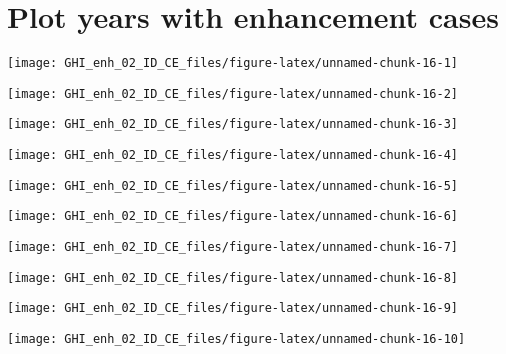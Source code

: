 \documentclass[
  10pt,
  a4paper,oneside]{article}
\begin{document}
\hypertarget{plot-years-with-enhancement-cases}{%
\section{Plot years with enhancement cases}\label{plot-years-with-enhancement-cases}}

\begin{center}\texttt{[image: GHI\_enh\_02\_ID\_CE\_files/figure-latex/unnamed-chunk-16-1]} \end{center}

\begin{center}\texttt{[image: GHI\_enh\_02\_ID\_CE\_files/figure-latex/unnamed-chunk-16-2]} \end{center}

\begin{center}\texttt{[image: GHI\_enh\_02\_ID\_CE\_files/figure-latex/unnamed-chunk-16-3]} \end{center}

\begin{center}\texttt{[image: GHI\_enh\_02\_ID\_CE\_files/figure-latex/unnamed-chunk-16-4]} \end{center}

\begin{center}\texttt{[image: GHI\_enh\_02\_ID\_CE\_files/figure-latex/unnamed-chunk-16-5]} \end{center}

\begin{center}\texttt{[image: GHI\_enh\_02\_ID\_CE\_files/figure-latex/unnamed-chunk-16-6]} \end{center}

\begin{center}\texttt{[image: GHI\_enh\_02\_ID\_CE\_files/figure-latex/unnamed-chunk-16-7]} \end{center}

\begin{center}\texttt{[image: GHI\_enh\_02\_ID\_CE\_files/figure-latex/unnamed-chunk-16-8]} \end{center}

\begin{center}\texttt{[image: GHI\_enh\_02\_ID\_CE\_files/figure-latex/unnamed-chunk-16-9]} \end{center}

\begin{center}\texttt{[image: GHI\_enh\_02\_ID\_CE\_files/figure-latex/unnamed-chunk-16-10]} \end{center}
\end{document}
